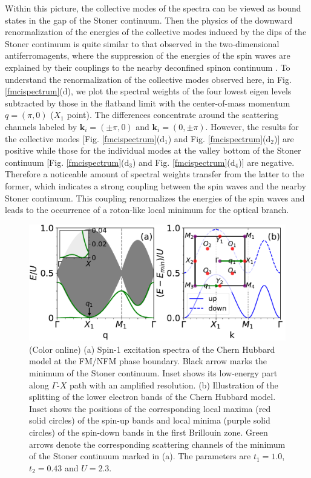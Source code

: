 \documentclass[amsmath,superscriptaddress,showpacs,aps,prb,twocolumn]{revtex4-1}
\begin{document}
\par Within this picture, the collective modes of the spectra can be viewed as bound states in the gap of the Stoner continuum. Then the physics of the downward renormalization of the energies of the collective modes induced by the dips of the Stoner continuum is quite similar to that observed in the two-dimensional antiferromagents, where the suppression of the energies of the spin waves are explained by their couplings to the nearby deconfined spinon continuum \cite{ZFSMC_PRL2006,TS_PRL2013,DMCNTPEMIR_NP2015,YWDYL_arXiv2018}. To understand the renormalization of the collective modes observed here, in Fig. \ref{fmcispectrum}(d), we plot the spectral weights of the four lowest eigen levels subtracted by those in the flatband limit with the center-of-mass momentum $q=(\pi,0)$ ($X_1$ point). The differences concentrate around the scattering channels labeled by $\mathbf{k}_i=(\pm\pi,0)$ and $\mathbf{k}_i=(0,\pm\pi)$. However, the results for the collective modes [Fig. \ref{fmcispectrum}($\text{d}_1$) and Fig. \ref{fmcispectrum}($\text{d}_2$)] are positive while those for the individual modes at the valley bottom of the Stoner continuum [Fig. \ref{fmcispectrum}($\text{d}_3$) and Fig. \ref{fmcispectrum}($\text{d}_4$)] are negative. Therefore a noticeable amount of spectral weights transfer from the latter to the former, which indicates a strong coupling between the spin waves and the nearby Stoner continuum. This coupling renormalizes the energies of the spin waves and leads to the occurrence of a roton-like local minimum for the optical branch.

\begin{figure}
\includegraphics[width=\columnwidth]{pbcispectrum}
\caption{(Color online) (a) Spin-1 excitation spectra of the Chern Hubbard model at the FM/NFM phase boundary. Black arrow marks the minimum of the Stoner continuum. Inset shows its low-energy part along $\Gamma$-$X$ path with an amplified resolution. (b) Illustration of the splitting of the lower electron bands of the Chern Hubbard model. Inset shows the positions of the corresponding local maxima (red solid circles) of the spin-up bands and local minima (purple solid circles) of the spin-down bands in the first Brillouin zone. Green arrows denote the corresponding scattering channels of the minimum of the Stoner continuum marked in (a). The parameters are $t_1=1.0$, $t_2=0.43$ and $U=2.3$.}
\label{pbcispectrum}
\end{figure}
\end{document}
